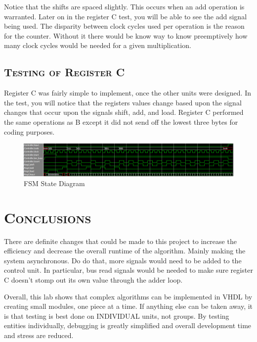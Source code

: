 \documentclass[11pt]{report}
\begin{document}
\begin{spacing}{1.5}
Notice that the shifts are spaced slightly.  This occurs when an add operation is warranted.  Later on in the register C test, you will be able to see the add signal being used.  The disparity between clock cycles used per operation is the reason for the counter.  Without it there would be know way to know preemptively how many clock cycles would be needed for a given multiplication.

\subsection{\scshape Testing of Register C}
\label{sub:design_fsm}

Register C was fairly simple to implement, once the other units were designed.  In the test, you will notice that the registers values change based upon the signal changes that occur upon the signals shift, add, and load.  Register C performed the same operations as B except it did not send off the lowest three bytes for coding purposes.

\vspace{15px}
\begin{figure}[H]
    \centering
    \includegraphics[width=1.0\textwidth,keepaspectratio]{reg_c.png}
    \caption{FSM State Diagram}
    \label{fig:diag_fsm}
\end{figure}

\clearpage

\section{\scshape Conclusions} %
\label{sec:conclusions}

There are definite changes that could be made to this project to increase the efficiency and decrease the overall runtime of the algorithm.  Mainly making the system asynchronous.  Do do that, more signals would need to be added to the control unit.  In particular, bus read signals would be needed to make sure register C doesn't stomp out its own value through the adder loop.

Overall, this lab shows that complex algorithms can be implemented in VHDL by creating small modules, one piece at a time.  If anything else can be taken away, it is that testing is best done on INDIVIDUAL units, not groups.  By testing entities individually, debugging is greatly simplified and overall development time and stress are reduced.


\end{spacing}
\end{document}
